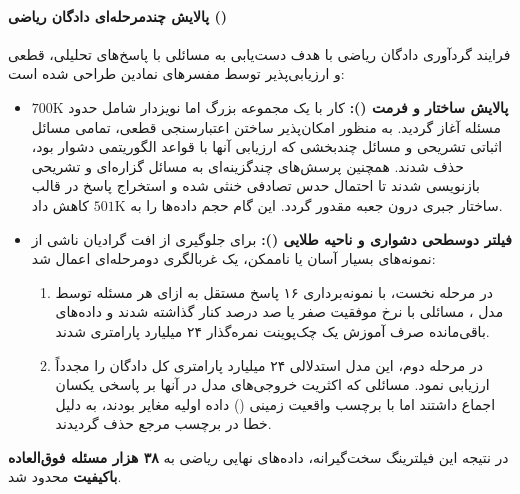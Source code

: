 \paragraph*{پالایش چندمرحله‌ای دادگان ریاضی ()}
فرایند گردآوری دادگان ریاضی با هدف دست‌یابی به مسائلی با پاسخ‌های تحلیلی، قطعی و ارزیابی‌پذیر توسط مفسرهای نمادین طراحی شده است:
\begin{itemize}
    \item \textbf{پالایش ساختار و فرمت ():} کار با یک مجموعه بزرگ اما نویزدار شامل حدود $700\text{K}$ مسئله آغاز گردید. به منظور امکان‌پذیر ساختن اعتبارسنجی قطعی، تمامی مسائل اثباتی تشریحی و مسائل چندبخشی که ارزیابی آنها با قواعد الگوریتمی دشوار بود، حذف شدند. همچنین پرسش‌های چندگزینه‌ای به مسائل گزاره‌ای و تشریحی بازنویسی شدند تا احتمال حدس تصادفی خنثی شده و استخراج پاسخ در قالب ساختار جبری  درون جعبه  مقدور گردد. این گام حجم داده‌ها را به $501\text{K}$ کاهش داد.
    \item \textbf{فیلتر دوسطحی دشواری و ناحیه طلایی ():} برای جلوگیری از افت گرادیان ناشی از نمونه‌های بسیار آسان یا ناممکن، یک غربالگری دومرحله‌ای اعمال شد:
    \begin{enumerate}
        \item در مرحله نخست، با نمونه‌برداری ۱۶ پاسخ مستقل به ازای هر مسئله توسط مدل  \cite{mistral2024large2}، مسائلی با نرخ موفقیت صفر یا صد درصد کنار گذاشته شدند و داده‌های باقی‌مانده صرف آموزش یک چک‌پوینت نمره‌گذار ۲۴ میلیارد پارامتری شدند.
        \item در مرحله دوم، این مدل استدلالی ۲۴ میلیارد پارامتری کل دادگان را مجدداً ارزیابی نمود. مسائلی که اکثریت خروجی‌های مدل در آنها بر پاسخی یکسان اجماع داشتند اما با برچسب واقعیت زمینی () داده اولیه مغایر بودند، به دلیل خطا در برچسب مرجع حذف گردیدند.
    \end{enumerate}
\end{itemize}
در نتیجه این فیلترینگ سخت‌گیرانه، داده‌های نهایی ریاضی به \textbf{۳۸ هزار مسئله فوق‌العاده باکیفیت} محدود شد.

